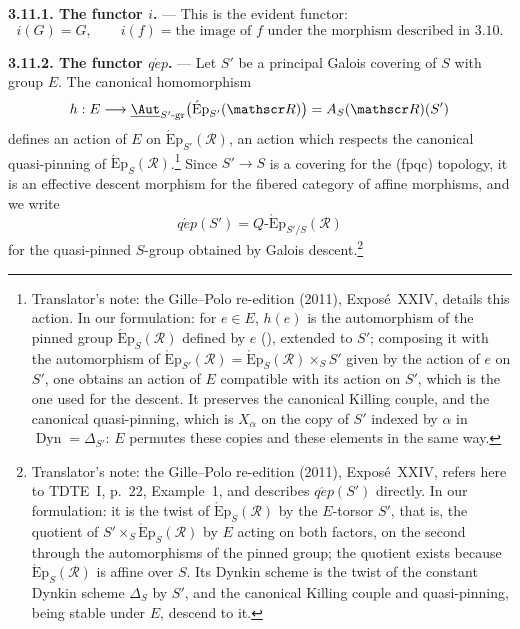 \medskip\noindent\textbf{3.11.1. The functor \(i\).} ---
This is the evident functor:
\[
  i(G)=G,
  \qquad
  i(f)=\text{the image of \(f\) under the morphism described in 3.10}.
\]

\medskip\noindent\textbf{3.11.2. The functor
\(q\acute{e}p\).} ---
Let \(S'\) be a principal Galois covering of \(S\) with group \(E\).
The canonical homomorphism
\[
  h:E
  \longrightarrow
  \underline{\Aut}_{S'\text{-}\mathrm{gr}}
    \bigl(\operatorname{\acute{E}p}_{S'}(\mathscr R)\bigr)
  =A_S(\mathscr R)(S')
\]
defines an action of \(E\) on \(\operatorname{\acute{E}p}_{S'}(\mathscr R)\), an action which
respects the canonical quasi-pinning of
\(\operatorname{\acute{E}p}_S(\mathscr R)\).\footnote{Translator's note: the Gille--Polo re-edition (2011), Exposé~XXIV, details this action. In
our formulation: for \(e\in E\), \(h(e)\) is the automorphism of the pinned group
\(\operatorname{\acute{E}p}_S(\mathscr R)\) defined by \(e\) \textup{()},
extended to \(S'\); composing it with the automorphism of
\(\operatorname{\acute{E}p}_{S'}(\mathscr R)=\operatorname{\acute{E}p}_S(\mathscr R)\times_SS'\) given by
the action of \(e\) on \(S'\), one obtains an action of \(E\) compatible with its action on \(S'\),
which is the one used for the descent. It preserves the canonical Killing couple, and the
canonical quasi-pinning, which is \(X_\alpha\) on the copy of \(S'\) indexed by \(\alpha\) in
\(\operatorname{Dyn}=\Delta_{S'}\): \(E\) permutes these copies and these elements in the same way.}
Since \(S'\to S\) is a covering for the \textup{(fpqc)} topology, it
is an effective descent morphism for the fibered category of affine
morphisms, and we write
\[
  q\acute{e}p(S')
  =
  Q\text{-}\operatorname{\acute{E}p}_{S'/S}(\mathscr R)
\]
for the quasi-pinned \(S\)-group obtained by Galois
descent.\footnote{Translator's note: the Gille--Polo re-edition (2011), Exposé~XXIV, refers here to TDTE~I, p.~22, Example~1, and describes
\(q\acute{e}p(S')\) directly. In our formulation: it is the twist of
\(\operatorname{\acute{E}p}_S(\mathscr R)\) by the \(E\)-torsor \(S'\), that is, the quotient of
\(S'\times_S\operatorname{\acute{E}p}_S(\mathscr R)\) by \(E\) acting on both factors, on the second
through the automorphisms of the pinned group; the quotient exists because
\(\operatorname{\acute{E}p}_S(\mathscr R)\) is affine over \(S\). Its Dynkin scheme is the twist of the
constant Dynkin scheme \(\Delta_S\) by \(S'\), and the canonical Killing couple and quasi-pinning,
being stable under \(E\), descend to it.}

